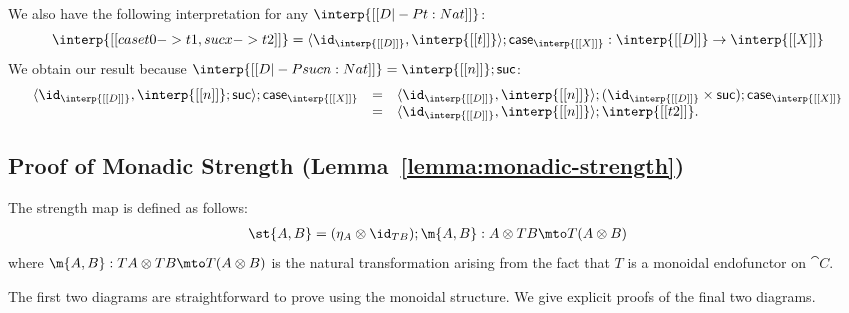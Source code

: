 \begin{itemize}
  We also have the following interpretation for any $\interp{[[D |-P t : Nat]]}$:
  \[
  \interp{[[case t {0 -> t1, suc x -> t2}]]} =
  \langle \id_{\interp{[[D]]}}, \interp{[[t]]} \rangle;\mathsf{case}_{\interp{[[X]]}} : \interp{[[D]]} \to \interp{[[X]]}
  \]
  We obtain our result because $\interp{[[D |-P suc n : Nat]]} = \interp{[[n]]};\mathsf{suc}$:
  \[
  \begin{array}{lll}
    \langle \id_{\interp{[[D]]}}, \interp{[[n]]};\mathsf{suc} \rangle;\mathsf{case}_{\interp{[[X]]}}
    &  = & \langle \id_{\interp{[[D]]}}, \interp{[[n]]} \rangle;(\id_{\interp{[[D]]}} \times \mathsf{suc});\mathsf{case}_{\interp{[[X]]}}\\
    &  = & \langle \id_{\interp{[[D]]}}, \interp{[[n]]} \rangle;\interp{[[t2]]}.
  \end{array}
  \]
\end{itemize}

\subsection{Proof of Monadic Strength (Lemma~\ref{lemma:monadic-strength})}
\label{subsec:proof_of_monadic_strength}
The strength map is defined as follows:
  \[
  \begin{array}{lll}
    \st{A,B} = (\eta_{A} \otimes \id_{TB});\m{A,B} : A \otimes TB \mto T(A \otimes B)\\    
  \end{array}
  \]
  where $\m{A,B} : TA \otimes TB \mto T(A \otimes B)$ is the natural
  transformation arising from the fact that $T$ is a monoidal
  endofunctor on $\cat{C}$.

  The first two diagrams are straightforward to prove using the
  monoidal structure.  We give explicit proofs of the final two
  diagrams.

